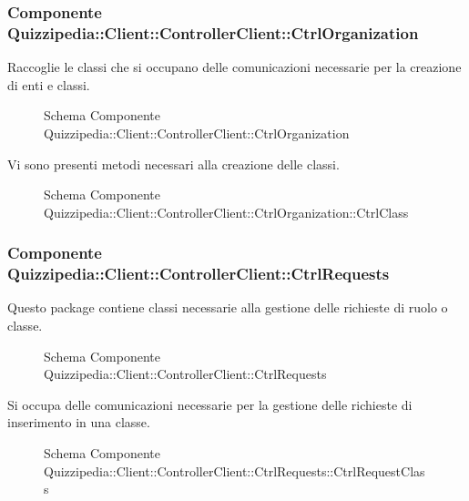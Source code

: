 \subsubsection{Componente Quizzipedia::Client::ControllerClient::CtrlOrganization}
Raccoglie le classi che si occupano delle comunicazioni necessarie per la creazione di enti e classi.
\begin{figure}[H]
\centering
\noindent{}
\caption{Schema Componente Quizzipedia::Client::ControllerClient::CtrlOrganization}
\end{figure}
Vi sono presenti metodi necessari alla creazione delle classi.
\begin{figure}[H]
\centering
\noindent{}
\caption{Schema Componente Quizzipedia::Client::ControllerClient::CtrlOrganization::CtrlClass}
\end{figure}
\subsubsection{Componente Quizzipedia::Client::ControllerClient::CtrlRequests}
Questo package contiene classi necessarie alla gestione delle richieste di ruolo o classe.
\begin{figure}[H]
\centering
\noindent{}
\caption{Schema Componente Quizzipedia::Client::ControllerClient::CtrlRequests}
\end{figure}
Si occupa delle comunicazioni necessarie per la gestione delle richieste di inserimento in una classe.
\begin{figure}[H]
\centering
\noindent{}
\caption{Schema Componente Quizzipedia::Client::ControllerClient::CtrlRequests::CtrlRequestClass}
\end{figure}
